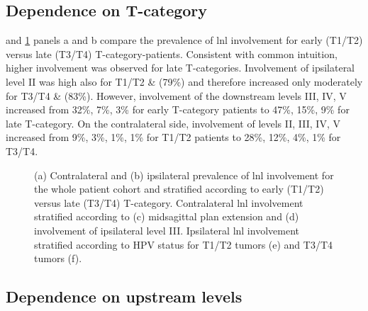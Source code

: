\documentclass[\relativeRoot/main.tex]{subfiles}
\begin{document}
\subsection*{Dependence on T-category}

 and \cref{fig:dataset:statistics} panels a and b compare the prevalence of \gls{lnl} involvement for early (T1/T2) versus late (T3/T4) T-category-patients. Consistent with common intuition, higher involvement was observed for late T-categories. Involvement of ipsilateral level II was high also for T1/T2 \& (79\%) and therefore increased only moderately for T3/T4 \& (83\%). However, involvement of the downstream levels III, IV, V increased from 32\%, 7\%, 3\% for early T-category patients to 47\%, 15\%, 9\% for late T-category. On the contralateral side, involvement of levels II, III, IV, V increased from 9\%, 3\%, 1\%, 1\% for T1/T2 patients to 28\%, 12\%, 4\%, 1\% for T3/T4.

\begin{figure}
    \centering
    \def\svgwidth{1.0\textwidth}
    
    \caption{(a) Contralateral and (b) ipsilateral prevalence of \gls{lnl} involvement for the whole patient cohort and stratified according to early (T1/T2) versus late (T3/T4) T-category. Contralateral \gls{lnl} involvement stratified according to (c) midsagittal plan extension and (d) involvement of ipsilateral level III. Ipsilateral \gls{lnl} involvement stratified according to HPV status for T1/T2 tumors (e) and T3/T4 tumors (f).}
    \label{fig:dataset:statistics}
\end{figure}

\subsection*{Dependence on upstream levels}
\end{document}
